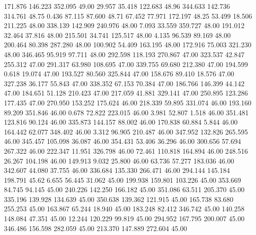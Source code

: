  171.876  146.223  352.095        49.00
  29.957   35.418  122.683        48.96
 344.633  142.736  314.761        48.75
   0.436   87.115   87.600        48.71
  67.452   77.971  172.197        48.25
  53.499   18.506  211.225        48.00
 338.139  142.909  240.976        48.00
   7.093   33.559  359.727        48.00
 191.012   32.464   37.816        48.00
 215.501   34.741  125.517        48.00
   4.135   96.539   89.169        48.00
 200.464   80.398  287.280        48.00
 100.902   54.409  163.195        48.00
 172.916   75.003  321.230        48.00
 346.465   95.919   97.711        48.00
 292.598  118.193  270.867        47.00
 323.537   42.847  255.312        47.00
 291.317   63.980  108.695        47.00
 339.755   69.680  212.380        47.00
 194.599    0.618   19.074        47.00
 193.527   80.560  325.844        47.00
 158.676   89.410   18.576        47.00
 327.238   36.177   55.843        47.00
 338.352   67.153   70.384        47.00
 186.766  146.399   44.142        47.00
 184.651   51.128  210.423        47.00
 217.059   41.881  329.141        47.00
 250.895  123.286  177.435        47.00
 270.950  153.252  175.624        46.00
 218.339   59.895  331.074        46.00
 193.160   89.209  351.846        46.00
   0.678   72.822  223.015        46.00
   3.981   52.807    1.518        46.00
 351.481  123.816   90.124        46.00
 335.873  144.157   88.002        46.00
 170.838   60.884    5.844        46.00
 164.442   62.077  348.402        46.00
   3.312   96.905  210.487        46.00
 347.952  132.826  265.595        46.00
 345.457  105.098   36.087        46.00
 354.431   53.406   36.296        46.00
 300.656   57.694  267.322        46.00
 222.347   11.951  326.798        46.00
  72.461  110.818  164.894        46.00
 248.516   26.267  104.198        46.00
 149.913    9.032   25.800        46.00
  63.736   57.277  183.036        46.00
 342.607   44.080   37.755        46.00
 336.684  135.330  266.471        46.00
 294.144  145.184  198.791        45.62
   6.655   56.445   31.062        45.00
 199.938  159.801  103.226        45.00
 353.669   84.745   94.145        45.00
 240.226  142.250  166.182        45.00
 351.086   63.511  205.370        45.00
 335.196  139.928  134.639        45.00
 350.638  139.362  121.915        45.00
 165.738   83.680  255.253        45.00
 163.867   65.244   18.940        45.00
 183.248   82.412  346.742        45.00
 140.258  148.084   47.351        45.00
  12.244  120.229   99.819        45.00
 294.952  167.795  200.007        45.00
 346.486  156.598  282.059        45.00
 213.370  147.889  272.604        45.00
